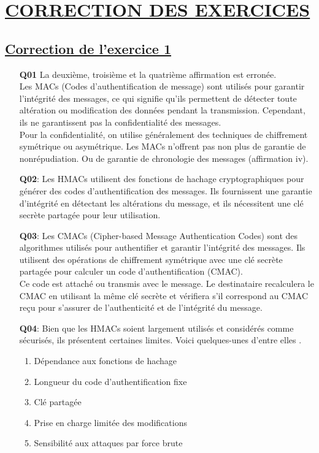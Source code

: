 \section{\textbf{\underline{CORRECTION DES EXERCICES}}}
\subsection{\textbf{\underline{Correction de l'exercice 1}}}\label{C_Exo 1}

\begin{enumerate}
    \item [\textbf{Q01}] La deuxième, troisième et la quatrième affirmation est erronée.\\

    Les MACs (Codes d'authentification de message) sont utilisés pour garantir l'intégrité des messages, ce qui signifie qu'ils permettent de détecter toute altération ou modification des données pendant la transmission.
    Cependant, ils ne garantissent pas la confidentialité des messages.\\
    
    Pour la confidentialité, on utilise généralement des techniques de chiffrement symétrique ou asymétrique. Les MACs n'offrent pas non plus de garantie de nonrépudiation.
    Ou de garantie de chronologie des messages (affirmation iv).
    
    \item [\textbf{Q02}:] Les HMACs utilisent des fonctions de hachage cryptographiques pour générer des codes d'authentification des messages. Ils fournissent une garantie d'intégrité en détectant les altérations du message, et ils nécessitent une clé secrète partagée pour leur utilisation.
    
    \item [\textbf{Q03}:] Les CMACs (Cipher-based Message Authentication Codes) sont des algorithmes utilisés pour authentifier et garantir l'intégrité des messages. Ils utilisent des opérations de chiffrement symétrique avec une clé secrète partagée pour calculer un code d'authentification (CMAC).\\

    Ce code est attaché ou transmis avec le message. Le destinataire recalculera le CMAC en utilisant la même clé secrète et vérifiera s'il correspond au CMAC reçu pour s'assurer de l'authenticité et de l'intégrité du message.

    \item [\textbf{Q04}:] Bien que les HMACs soient largement utilisés et considérés comme sécurisés, ils présentent certaines limites. Voici quelques-unes d'entre elles .
    \begin{enumerate}
        \item Dépendance aux fonctions de hachage
        \item Longueur du code d'authentification fixe
        \item Clé partagée 
        \item Prise en charge limitée des modifications
        \item Sensibilité aux attaques par force brute
    \end{enumerate}
    

\end{enumerate}
